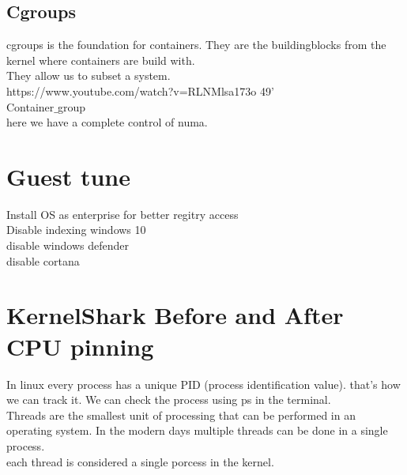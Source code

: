 \documentclass[11pt, a4paper, oneside]{article}
\theoremstyle{definition}
\begin{document}
\vfill
\pagebreak
\subsection{Cgroups}
cgroups is the foundation for containers. They are the buildingblocks from the kernel where containers are build with.\\
They allow us to subset a system.\\
https://www.youtube.com/watch?v=RLNMlsa173o 49'\\
Container$\_$group\\
here we have a complete control of numa. 

\vfill
\pagebreak
\section{Guest tune}
Install OS as enterprise for better regitry access\\
Disable indexing windows 10\\
disable windows defender\\
disable cortana\\

\vfill
\pagebreak
\section{KernelShark Before and After CPU pinning}

In linux every process has a unique PID (process identification value). that's how we can track it.
We can check the process using ps in the terminal.\\
Threads are the smallest unit of processing that can be performed in an operating system. In the modern days multiple threads can be done in a single process.\\
each thread is considered a single porcess in the kernel.\\



\vfill
\pagebreak
\end{document}
